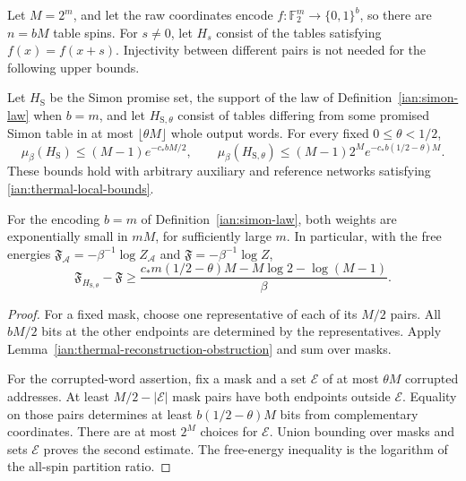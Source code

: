 \begin{proposition}
\label{ian:thermal-simon-raw-obstruction}
Let \(M=2^m\), and let the raw coordinates encode
\(f:\mathbb F_2^m\to\{0,1\}^b\), so there are \(n=bM\) table spins.
For \(s\ne0\), let \(H_s\) consist of the tables satisfying
\(f(x)=f(x+s)\). Injectivity between different pairs is not needed for
the following upper bounds.

Let \(H_{\mathrm S}\) be the Simon promise set, the support of the law
of Definition~\ref{ian:simon-law} when \(b=m\), and let
\(H_{\mathrm S,\theta}\) consist of tables differing from some promised
Simon table in at most \(\lfloor\theta M\rfloor\) whole output words.
For every fixed \(0\le\theta<1/2\),
\[
 \mu_\beta(H_{\mathrm S})
 \le(M-1)e^{-c_*bM/2},
 \qquad
 \mu_\beta(H_{\mathrm S,\theta})
 \le(M-1)2^M e^{-c_*b(1/2-\theta)M}.
 \tag{36.5}\label{ian:thermal-simon-raw-mass}
\]
These bounds hold with arbitrary auxiliary and reference networks
satisfying \eqref{ian:thermal-local-bounds}.

For the encoding \(b=m\) of Definition~\ref{ian:simon-law}, both
weights are exponentially small in \(mM\), for sufficiently large
\(m\). In particular, with the free energies
\(\mathfrak F_{\mathcal A}=-\beta^{-1}\log Z_{\mathcal A}\) and
\(\mathfrak F=-\beta^{-1}\log Z\),
\[
 \mathfrak F_{H_{\mathrm S,\theta}}-\mathfrak F
 \ge\frac{
 c_*m(1/2-\theta)M-M\log2-\log(M-1)}{\beta}.
 \tag{36.6}
\]
\end{proposition}

\begin{proof}
For a fixed mask, choose one representative of each of its \(M/2\)
pairs. All \(bM/2\) bits at the other endpoints are determined by the
representatives. Apply Lemma~\ref{ian:thermal-reconstruction-obstruction}
and sum over masks.

For the corrupted-word assertion, fix a mask and a set \(\mathcal E\) of at most
\(\theta M\) corrupted addresses. At least \(M/2-|\mathcal E|\) mask pairs have
both endpoints outside \(\mathcal E\). Equality on those pairs determines at
least \(b(1/2-\theta)M\) bits from complementary coordinates. There
are at most \(2^M\) choices for \(\mathcal E\). Union bounding over masks and
sets \(\mathcal E\) proves the second estimate. The free-energy inequality is
the logarithm of the all-spin partition ratio.
\end{proof}

